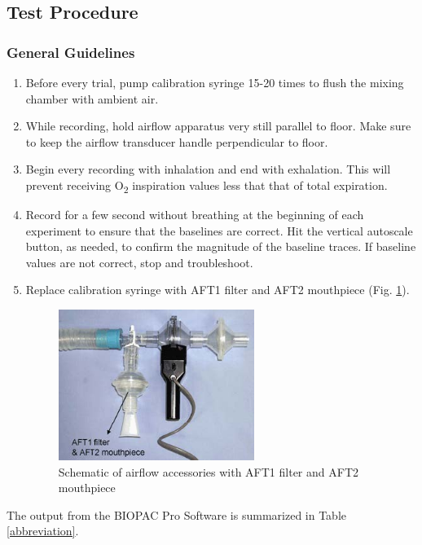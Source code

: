 \documentclass{article}
\begin{document}
\subsection*{Test Procedure}
\subsubsection*{General Guidelines}
\begin{enumerate}
	\item Before every trial, pump calibration syringe 15-20 times to flush the mixing chamber with ambient air.
	\item While recording, hold airflow apparatus very still parallel to floor. Make sure to keep the airflow transducer handle perpendicular to floor.
	\item Begin every recording with inhalation and end with exhalation. This will prevent receiving O\textsubscript{2} inspiration values less that that of total expiration.
	\item Record for a few second without breathing at the beginning of each experiment to ensure that the baselines are correct. Hit the vertical autoscale button, as needed, to confirm the magnitude of the baseline traces. If baseline values are not correct, stop and troubleshoot.
	\item Replace calibration syringe with AFT1 filter and AFT2 mouthpiece (Fig. \ref{syringe}).
	\begin{figure}[h]
	\centering\includegraphics[width=0.6\textwidth]{../images/PF_II_8.jpg}
	\caption{Schematic of airflow accessories with AFT1 filter and AFT2 mouthpiece}
	\label{syringe}
	\end{figure}
\end{enumerate}

The output from the BIOPAC Pro Software is summarized in Table \ref{abbreviation}.
\end{document}

